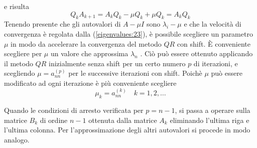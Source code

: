e risulta
$$Q_k A_{k+1} = A_k Q_k − \mu Q_k + \mu Q_k = A_k Q_k $$
Tenendo presente che gli autovalori di $A − \mu I$ sono $\lambda_i − \mu$ e che
 la velocit\`a
di convergenza \`e regolata dalla (\ref{eigenvalues:23}), \`e
 possibile scegliere un parametro $\mu$
in modo da accelerare la convergenza del metodo $QR$ con shift. \`E conveniente
scegliere per $\mu$ un valore che approssima $\lambda_n$ . Ci\`o pu\`o essere ottenuto
applicando il metodo $QR$ inizialmente senza shift per un certo numero $p$ di
iterazioni, e scegliendo $\mu = a_{nn}^{(p)}$ per le successive iterazioni con shift.
Poich\`e $\mu$ pu\`o essere modificato ad ogni iterazione \`e pi\`u conveniente
scegliere
\begin{equation}
\label{eigenvalues:24}
\mu_k = a_{nn}^{(k)} \quad k = 1, 2, \ldots
\end{equation}

Quando le condizioni di arresto verificata per $p = n−1$, si passa a operare sulla matrice
$B_k$ di ordine $n - 1$ ottenuta dalla matrice $A_k$ eliminando l'ultima riga e
l'ultima colonna. Per l'approssimazione degli altri autovalori si procede in
modo analogo.

%

